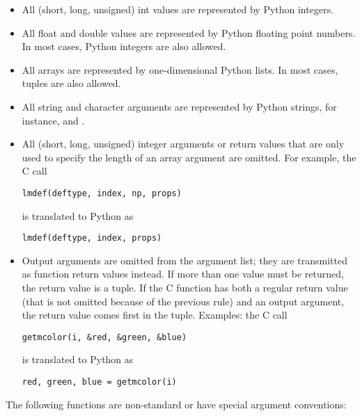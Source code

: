 \begin{itemize}
\item
All (short, long, unsigned) int values are represented by Python
integers.
\item
All float and double values are represented by Python floating point
numbers.
In most cases, Python integers are also allowed.
\item
All arrays are represented by one-dimensional Python lists.
In most cases, tuples are also allowed.
\item
\begin{sloppypar}
All string and character arguments are represented by Python strings,
for instance,
and
.
\end{sloppypar}
\item
All (short, long, unsigned) integer arguments or return values that are
only used to specify the length of an array argument are omitted.
For example, the C call

\bcode\begin{verbatim}
lmdef(deftype, index, np, props)
\end{verbatim}\ecode

is translated to Python as

\bcode\begin{verbatim}
lmdef(deftype, index, props)
\end{verbatim}\ecode

\item
Output arguments are omitted from the argument list; they are
transmitted as function return values instead.
If more than one value must be returned, the return value is a tuple.
If the C function has both a regular return value (that is not omitted
because of the previous rule) and an output argument, the return value
comes first in the tuple.
Examples: the C call

\bcode\begin{verbatim}
getmcolor(i, &red, &green, &blue)
\end{verbatim}\ecode

is translated to Python as

\bcode\begin{verbatim}
red, green, blue = getmcolor(i)
\end{verbatim}\ecode

\end{itemize}

The following functions are non-standard or have special argument
conventions:

